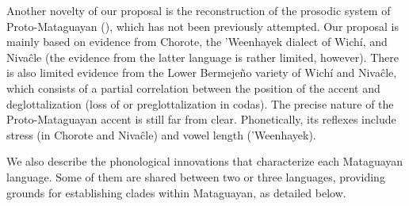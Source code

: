 Another novelty of our proposal is the reconstruction of the prosodic system of Proto-Mataguayan (), which has not been previously attempted. Our proposal is mainly based on evidence from Chorote, the ’Weenhayek dialect of Wichí, and Nivaĉle (the evidence from the latter language is rather limited, however). There is also limited evidence from the Lower Bermejeño variety of Wichí and Nivaĉle, which consists of a partial correlation between the position of the accent and deglottalization (loss of  or preglottalization in codas). The precise nature of the Proto-Mataguayan accent is still far from clear. Phonetically, its reflexes include stress (in Chorote and Nivaĉle) and vowel length (’Weenhayek).

We also describe the phonological innovations that characterize each Mataguayan language. Some of them are shared between two or three languages, providing grounds for establishing clades within Mataguayan, as detailed below.

